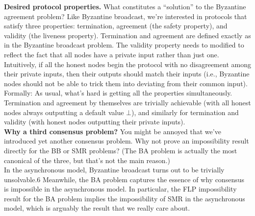 \noindent
\textbf{Desired protocol properties.} What constitutes a “solution” to the Byzantine agreement
problem? Like Byzantine broadcast, we’re interested in protocols that satisfy three properties: termination, agreement (the safety property), and validity (the liveness property). Termination and agreement are defined exactly as in the Byzantine broadcast problem. The
validity property needs to modified to reflect the fact that all nodes have a private input
rather than just one. Intuitively, if all the honest nodes begin the protocol with no disagreement among their private inputs, then their outputs should match their inputs (i.e., Byzantine nodes should not be able to trick them into deviating from their common input).
Formally:
As usual, what’s hard is getting all the properties simultaneously. Termination and agreement by themselves are trivially achievable (with all honest nodes always outputting a default value $\bot$), and similarly for termination and validity (with honest nodes outputting their private inputs).\\

\noindent
\textbf{Why a third consensus problem?} You might be annoyed that we’ve introduced yet
another consensus problem. Why not prove an impossibility result directly for the BB or
SMR problems? (The BA problem is actually the most canonical of the three, but that’s
not the main reason.)\\
In the asynchronous model, Byzantine broadcast turns out to be trivially unsolvable.6
Meanwhile, the BA problem captures the essence of why consensus is impossible in the
asynchronous model. In particular, the FLP impossibility result for the BA problem implies
the impossibility of SMR in the asynchronous model, which is arguably the result that we
really care about.

